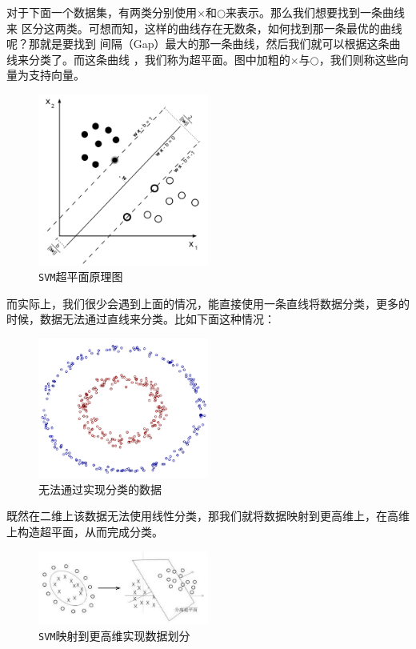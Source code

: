 \documentclass[11pt,a4paper]{elegantpaper}
\begin{document}
\begin{multicols}{2}
对于下面一个数据集，有两类分别使用$×$和$○$来表示。那么我们想要找到一条曲线来
区分这两类。可想而知，这样的曲线存在无数条，如何找到那一条最优的曲线呢？那就是要找到
间隔（Gap）最大的那一条曲线，然后我们就可以根据这条曲线来分类了。而这条曲线
，我们称为超平面。图中加粗的$×$与$○$，我们则称这些向量为支持向量。

\begin{figure}[H]
  \centering
  \includegraphics[width=0.5\textwidth]{images/SVM.png}
  \caption{\lstinline{SVM}超平面原理图} 
\end{figure}

而实际上，我们很少会遇到上面的情况，能直接使用一条直线将数据分类，更多的时候，数据无法通过直线来分类。比如下面这种情况：

\begin{figure}[H]
  \centering
  \includegraphics[width=0.5\textwidth]{images/SSS.png}
  \caption{无法通过实现分类的数据} 
\end{figure}

既然在二维上该数据无法使用线性分类，那我们就将数据映射到更高维上，在高维上构造超平面，从而完成分类。

\begin{figure}[H]
  \centering
  \includegraphics[width=0.5\textwidth]{images/SS.png}
  \caption{\lstinline{SVM}映射到更高维实现数据划分} 
\end{figure}


\end{multicols}
\end{document}
